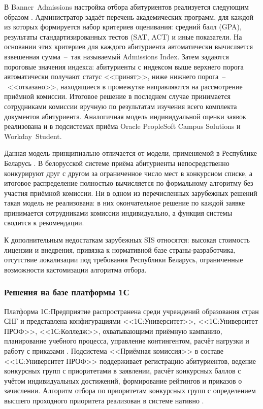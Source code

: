 В Banner~Admissions настройка отбора абитуриентов реализуется следующим образом .
Администратор задаёт перечень академических программ, для каждой из которых формируется набор критериев оценивания: средний балл (GPA), результаты стандартизированных тестов (SAT, ACT) и иные показатели.
На основании этих критериев для каждого абитуриента автоматически вычисляется взвешенная сумма~--~так называемый Admissions Index.
Затем задаются пороговые значения индекса: абитуриенты с индексом выше верхнего порога автоматически получают статус <<принят>>, ниже нижнего порога~--~<<отказано>>, находящиеся в промежутке направляются на рассмотрение приёмной комиссии.
Итоговое решение в последнем случае принимается сотрудниками комиссии вручную по результатам изучения всего комплекта документов абитуриента.
Аналогичная модель индивидуальной оценки заявок реализована и в подсистемах приёма Oracle PeopleSoft Campus Solutions  и Workday~Student.

Данная модель принципиально отличается от модели, применяемой в Республике Беларусь .
В белорусской системе приёма абитуриенты непосредственно конкурируют друг с другом за ограниченное число мест в конкурсном списке, а итоговое распределение полностью вычисляется по формальному алгоритму без участия приёмной комиссии.
Ни в одном из перечисленных зарубежных решений такая модель не реализована: в них окончательное решение по каждой заявке принимается сотрудниками комиссии индивидуально, а функция системы сводится к рекомендации.

К дополнительным недостаткам зарубежных SIS относятся: высокая стоимость лицензии и внедрения, привязка к нормативной базе страны-разработчика, отсутствие локализации под требования Республики Беларусь, ограниченные возможности кастомизации алгоритма отбора.

\subsubsection{Решения на базе платформы 1С}

Платформа 1С:Предприятие  распространена среди учреждений образования стран СНГ и представлена конфигурациями <<1С:Университет>>, <<1С:Университет ПРОФ>>, <<1С:Колледж>>, охватывающими приёмную кампанию, планирование учебного процесса, управление контингентом, расчёт нагрузки и работу с приказами .
Подсистема <<Приёмная комиссия>> в составе <<1С:Университет ПРОФ>> поддерживает регистрацию абитуриентов, ведение конкурсных групп с приоритетами в заявлении, расчёт конкурсных баллов с учётом индивидуальных достижений, формирование рейтингов и приказов о зачислении.
Алгоритм отбора по приоритетам конкурсных групп с определением высшего проходного приоритета реализован в системе нативно .


